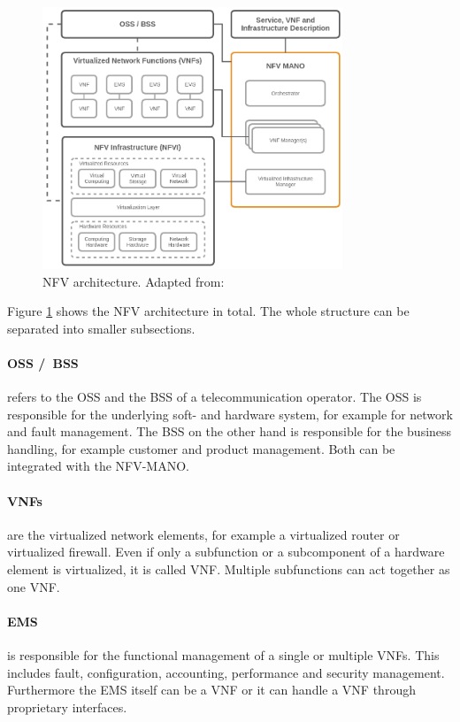\begin{figure}[H]
    \centering
    \includegraphics[width=0.8\textwidth]{resources/images/nfv_architecture.png}
    \caption[NFV architecture]{NFV architecture. Adapted from: \autocite{NFV:Architecture}}
    \label{fig:nfv_architecture}
\end{figure}

Figure \ref{fig:nfv_architecture} shows the \ac{NFV} architecture in total.
The whole structure can be separated into smaller subsections.

\paragraph{\acs{OSS} /\ \acs{BSS}} refers to the \ac{OSS} and the \ac{BSS} of a telecommunication operator.\autocite[cf.]{Kahn:2015}
The \ac{OSS} is responsible for the underlying soft- and hardware system, for example for network and fault management.
The \ac{BSS} on the other hand is responsible for the business handling, for example customer and product management.
Both can be integrated with the \ac{NFV-MANO}.\autocite[cf.]{Kahn:2015}

\paragraph{\acp{VNF}} are the virtualized network elements, for example a virtualized router or virtualized firewall.
Even if only a subfunction or a subcomponent of a hardware element is virtualized, it is called \ac{VNF}.\autocite[cf.]{Kahn:2015}
Multiple subfunctions can act together as one \ac{VNF}.

\paragraph{\ac{EMS}} is responsible for the functional management of a single or multiple \acp{VNF}.\autocite[cf.]{Kahn:2015}
This includes fault, configuration, accounting, performance and security management.\autocite[cf.]{Kahn:2015}
Furthermore the \ac{EMS} itself can be a \ac{VNF} or it can handle a \ac{VNF} through proprietary interfaces.\autocite[cf.]{Kahn:2015}

